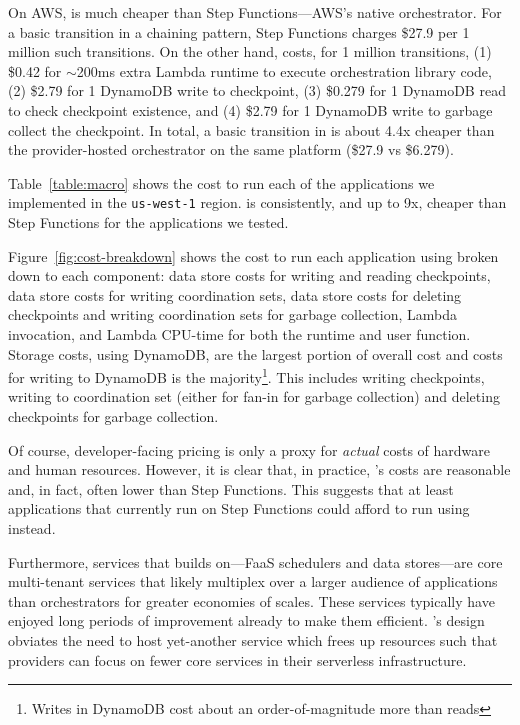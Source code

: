 On AWS, \name{} is much cheaper than Step Functions---AWS's native
orchestrator. For a basic transition in a chaining pattern, Step Functions
charges \$27.9 per 1 million such transitions. On the other hand,
\name{} costs, for 1 million transitions, (1) \$0.42 for $\sim$200ms extra
Lambda runtime to execute orchestration library code, (2) \$2.79 for 1
DynamoDB write to checkpoint, (3) \$0.279 for 1 DynamoDB read to check
checkpoint existence, and (4) \$2.79 for 1 DynamoDB write to garbage collect
the checkpoint. In total, a basic transition in \name{} is about 4.4x cheaper
than the provider-hosted orchestrator on the same platform (\$27.9 vs
\$6.279).

Table~\ref{table:macro} shows the cost to run each of the applications we
implemented in the \texttt{us-west-1} region. \name{} is consistently,
and up to 9x, cheaper than Step Functions for the applications we tested.

Figure~\ref{fig:cost-breakdown} shows the cost to run each application using
\name{} broken down to each component: data store costs for writing and
reading checkpoints, data store costs for writing coordination sets, data
store costs for deleting checkpoints and writing coordination sets for garbage
collection, Lambda invocation, and Lambda CPU-time for both the \name{}
runtime and user function. Storage costs, using DynamoDB, are the largest
portion of overall cost and costs for writing to DynamoDB is the
majority\footnote{Writes in DynamoDB cost about an order-of-magnitude more
than reads}. This includes writing checkpoints, writing to coordination set
(either for fan-in for garbage collection) and deleting checkpoints for
garbage collection.

Of course, developer-facing pricing is only a proxy for \emph{actual} costs of
hardware and human resources. However, it is clear that, in practice,
\name{}'s costs are reasonable and, in fact, often lower than Step Functions.
This suggests that at least applications that currently run on Step Functions
could afford to run using \name{} instead.

Furthermore, services that \name{} builds on---FaaS schedulers and data
stores---are core multi-tenant services that likely multiplex over a larger
audience of applications than orchestrators for greater economies of scales.
These services typically have enjoyed long periods of improvement already to
make them efficient. \name{}'s design obviates the need to host yet-another
service which frees up resources such that providers can focus on fewer core
services in their serverless infrastructure.


